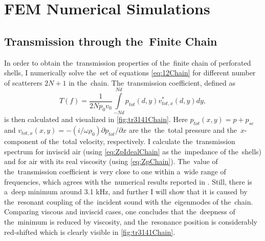


\section{FEM Numerical Simulations}

\subsection{Transmission through the~Finite Chain}


In order to obtain the~transmission properties of the~finite chain of perforated shells, I numerically solve the~set of equations \cref{eq:12Chain} for different number of scatterers $2N+1$ in the~chain.
The~transmission coefficient, defined as
\begin{equation}
T(f) = \frac{1}{2 N p_0 v_0} \int\limits_{-N d}^{N d} p_{tot}(d, y) v_{tot,x}^{*}(d, y)dy,
\end{equation}
is then calculated and visualized in \cref{fig:tr3141Chain}.
Here $p_{tot}(x,y)=p+p_{sc}$ and $v_{tot,x}(x,y)= -(i/\omega \rho_0) \partial p_{tot}/\partial x$ are the~the~total pressure and the~$x$-component of the~total velocity, respectively.
I calculate the~transmission spectrum for inviscid air (using \cref{eq:ZpIdealChain} as the~impedance of the~shells) and for air with its real viscosity (using \cref{eq:ZpChain}).
The~value of the~transmission coefficient is very close to one within a~wide range of frequencies, which agrees with the~numerical results reported in \cite{garcia1}.
Still, there is a~deep minimum around 3.1 kHz, and further I will show that it is caused by the~resonant coupling of the~incident sound with the~eigenmodes of the~chain.
Comparing viscous and inviscid cases, one concludes that the~deepness of the~minimum is reduced by viscosity, and the~resonance position is considerably red-shifted which is clearly visible in \cref{fig:tr3141Chain}.



